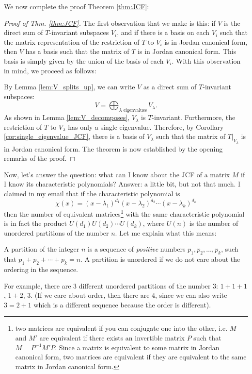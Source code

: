 We now complete the proof Theorem \ref{thm:JCF}:

\begin{proof}[Proof of Thm. \ref{thm:JCF}]
The first observation that we make is this: if $V$ is the direct sum
of $T$-invariant subspaces $V_i$, and if there is a basis on each
$V_i$ such that the matrix representation of the restriction of 
$T$ to $V_i$ is in Jordan canonical form, then $V$ has a basis such
that the matrix of $T$ is in Jordan canonical form. This basis is
simply given by the union of the basis of each $V_i$. With this
observation in mind, we proceed as follows:

By Lemma \ref{lem:V_splits_up}, we can write $V$ as a direct
sum of $T$-invariant subspaces:
\[
V = \bigoplus_{\lambda \textrm{ eigenvalues}} V_\lambda.
\]
As shown in Lemma \ref{lem:V_decomposes}, $V_\lambda$ is $T$-invariant.
Furthermore, the restriction of $T$ to $V_\lambda$ has only a single
eigenvalue. Therefore, by Corollary \ref{cor:single_eigenvalue_JCF},
there is a basis of $V_\lambda$ such that the matrix of 
$T|_{V_{\lambda}}$ is in Jordan canonical form. The theorem is now
established by the opening remarks of the proof.
\end{proof}

Now, let's answer the question: what can I know about the JCF
of a matrix $M$ if I know its characteristic polynomials? Answer:
a little bit, but not that much. I claimed in my email that
if the characteristic polynomial is 
\[
\chi(x) = (x - \lambda_1)^{d_1}(x - \lambda_2)^{d_2} \cdots (x - 
   \lambda_k)^{d_k}
\]
then the number of equivalent matrices\footnote{two matrices are
equivalent if you can conjugate one into the other, i.e. $M$ and $M'$ are
equivalent if there exists an invertible matrix $P$ such that
$M = P^{-1}M'P$. Since a matrix is equivalent to some matrix in Jordan canonical form,
two matrices are equivalent if they are equivalent to the same matrix in 
Jordan canonical form.} with the same characteristic
polynomial is in fact the product $U(d_1)U(d_2)\cdots U(d_k)$,
where $U(n)$ is the number of unordered partitions of the number $n$.
Let me explain what this means:

\begin{defn}
A partition of the integer $n$ is a sequence of \emph{positive} numbers
$p_1,p_2,\dots,p_k$, such that $p_1 + p_2 + \cdots + p_k = n$. A partition
is unordered if we do not care about the ordering in the sequence.
\end{defn}

For example, there are $3$ different unordered partitions of
the number $3$: $1 + 1 + 1$, $1 + 2$, $3$. (If we care about
order, then there are $4$, since we can also write $3 = 2 + 1$
which is a different sequence because the order is different).

